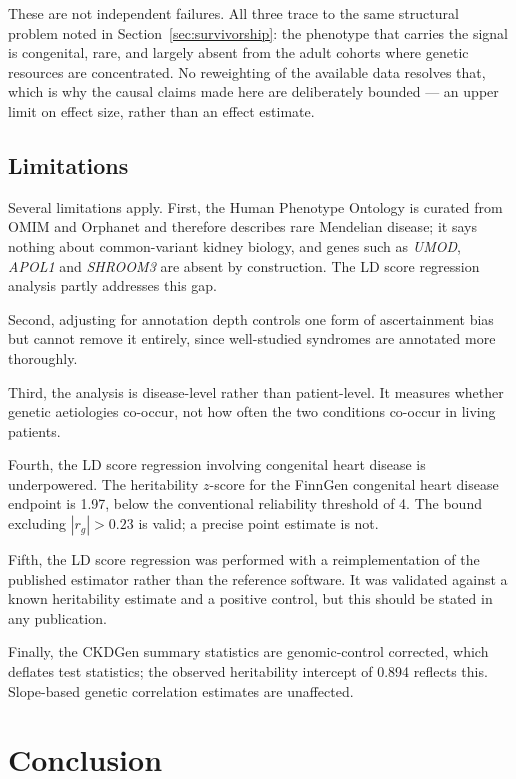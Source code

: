 \documentclass[11pt,a4paper]{article}
\newcommand{\gene}[1]{\textit{#1}}
\begin{document}
These are not independent failures. All three trace to the same structural problem noted in
Section~\ref{sec:survivorship}: the phenotype that carries the signal is congenital, rare,
and largely absent from the adult cohorts where genetic resources are concentrated. No
reweighting of the available data resolves that, which is why the causal claims made here are
deliberately bounded --- an upper limit on effect size, rather than an effect estimate.

\subsection{Limitations}

Several limitations apply. First, the Human Phenotype Ontology is curated from OMIM and
Orphanet and therefore describes rare Mendelian disease; it says nothing about common-variant
kidney biology, and genes such as \gene{UMOD}, \gene{APOL1} and \gene{SHROOM3} are absent by
construction. The LD score regression analysis partly addresses this gap.

Second, adjusting for annotation depth controls one form of ascertainment bias but cannot
remove it entirely, since well-studied syndromes are annotated more thoroughly.

Third, the analysis is disease-level rather than patient-level. It measures whether genetic
aetiologies co-occur, not how often the two conditions co-occur in living patients.

Fourth, the LD score regression involving congenital heart disease is underpowered. The
heritability $z$-score for the FinnGen congenital heart disease endpoint is 1.97, below the
conventional reliability threshold of 4. The bound excluding $|r_g| > 0.23$ is valid; a
precise point estimate is not.

Fifth, the LD score regression was performed with a reimplementation of the published
estimator rather than the reference software. It was validated against a known heritability
estimate and a positive control, but this should be stated in any publication.

Finally, the CKDGen summary statistics are genomic-control corrected, which deflates test
statistics; the observed heritability intercept of 0.894 reflects this. Slope-based genetic
correlation estimates are unaffected.

\section{Conclusion}
\end{document}
